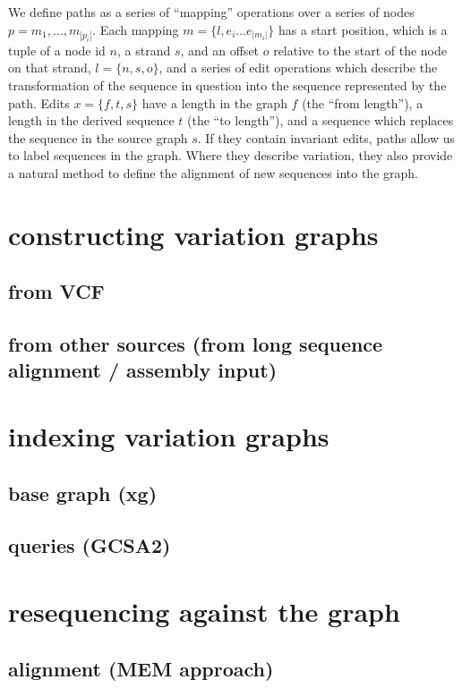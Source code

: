 \documentclass{article}
\begin{document}
We define paths as a series of ``mapping'' operations over a series of nodes $p = m_1, \ldots, m_{|p_i|}$.
Each mapping $m = \{ l, e_i \ldots e_{|m_i|} \}$ has a start position, which is a tuple of a node id $n$, a strand $s$, and an offset $o$ relative to the start of the node on that strand, $l = \{ n, s, o \}$, and a series of edit operations which describe the transformation of the sequence in question into the sequence represented by the path.
Edits $x = \{ f, t, s \}$ have a length in the graph $f$ (the ``from length''), a length in the derived sequence $t$ (the ``to length''), and a sequence which replaces the sequence in the source graph $s$.
If they contain invariant edits, paths allow us to label sequences in the graph.
Where they describe variation, they also provide a natural method to define the alignment of new sequences into the graph.

\section{constructing variation graphs}

\subsection{from VCF}

\subsection{from other sources (from long sequence alignment / assembly input)}


\section{indexing variation graphs}

\subsection{base graph (xg)}

\subsection{queries (GCSA2)}


\section{resequencing against the graph}

\subsection{alignment (MEM approach)}
\end{document}
